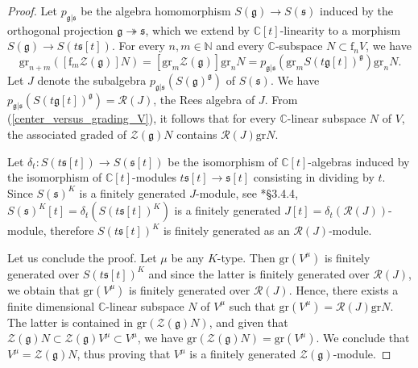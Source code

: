 \documentclass{amsart}
\theoremstyle{definition}
\begin{document}
\begin{proof}
    Let $p_{\mathfrak{g}|\mathfrak{s}}$ be the algebra homomorphism $S(\mathfrak{g}) \to S(\mathfrak{s})$ induced by the orthogonal projection $\mathfrak{g} \twoheadrightarrow \mathfrak{s}$, which we extend by $\mathbb{C}[t]$-linearity to a morphism $S(\bm{\mathfrak{g}}) \to S(t\mathfrak{s}[t])$. For every $n,m \in \mathbb{N}$ and every $\mathbb{C}$-subspace $N \subset \mathrm{f}_nV$, we have
    \begin{equation}\label{center_versus_grading_V}
        \mathrm{gr}_{n+m}\left([\mathrm{f}_m \mathcal{Z}(\bm{\mathfrak{g}})] N\right) = [\mathrm{gr}_m \mathcal{Z}(\bm{\mathfrak{g}})] \mathrm{gr}_n N = p_{\mathfrak{g}|\mathfrak{s}}(\mathrm{gr}_m S(t\mathfrak{g}[t])^\mathfrak{g}) \mathrm{gr}_n N.
    \end{equation}
    Let $J$ denote the subalgebra $p_{\mathfrak{g}|\mathfrak{s}}(S(\mathfrak{g})^\mathfrak{g})$ of $S(\mathfrak{s})$. We have $p_{\mathfrak{g}|\mathfrak{s}}(S(t\mathfrak{g}[t])^\mathfrak{g})  = \mathcal{R}(J)$, the Rees algebra of $J$. From (\ref{center_versus_grading_V}), it follows that for every $\mathbb{C}$-linear subspace $N$ of $V$, the associated graded of $\mathcal{Z}(\bm{\mathfrak{g}}) N$ contains $\mathcal{R}(J) \mathrm{gr}N$.

    Let $\delta_t : S(t\mathfrak{s}[t]) \to S(\mathfrak{s}[t])$ be the isomorphism of $\mathbb{C}[t]$-algebras induced by the isomorphism of $\mathbb{C}[t]$-modules $t\mathfrak{s}[t] \to \mathfrak{s}[t]$ consisting in dividing by $t$. Since $S(\mathfrak{s})^K$ is a finitely generated $J$-module, see \cite{Wallach}*{§3.4.4}, $S(\mathfrak{s})^K[t] = \delta_t(S(t\mathfrak{s}[t])^K)$ is a finitely generated $J[t] = \delta_t(\mathcal{R}(J))$-module, therefore $S(t\mathfrak{s}[t])^K$ is finitely generated as an $\mathcal{R}(J)$-module.

    Let us conclude the proof. Let $\mu$ be any $K$-type. Then $\mathrm{gr}(V^\mu)$ is finitely generated over $S(t\mathfrak{s}[t])^K$ and since the latter is finitely generated over $\mathcal{R}(J)$, we obtain that $\mathrm{gr}(V^\mu)$ is finitely generated over $\mathcal{R}(J)$. Hence, there exists a finite dimensional $\mathbb{C}$-linear subspace $N$ of $V^\mu$ such that $\mathrm{gr}(V^\mu) = \mathcal{R}(J) \mathrm{gr}N$. The latter is contained in $\mathrm{gr}(\mathcal{Z}(\bm{\mathfrak{g}})N)$, and given that $\mathcal{Z}(\bm{\mathfrak{g}})N \subset \mathcal{Z}(\bm{\mathfrak{g}})V^\mu \subset V^\mu$, we have $\mathrm{gr}(\mathcal{Z}(\bm{\mathfrak{g}})N) = \mathrm{gr}(V^\mu)$. We conclude that $V^\mu = \mathcal{Z}(\bm{\mathfrak{g}})N$, thus proving that $V^\mu$ is a finitely generated $\mathcal{Z}(\bm{\mathfrak{g}})$-module.
\end{proof}
\end{document}
